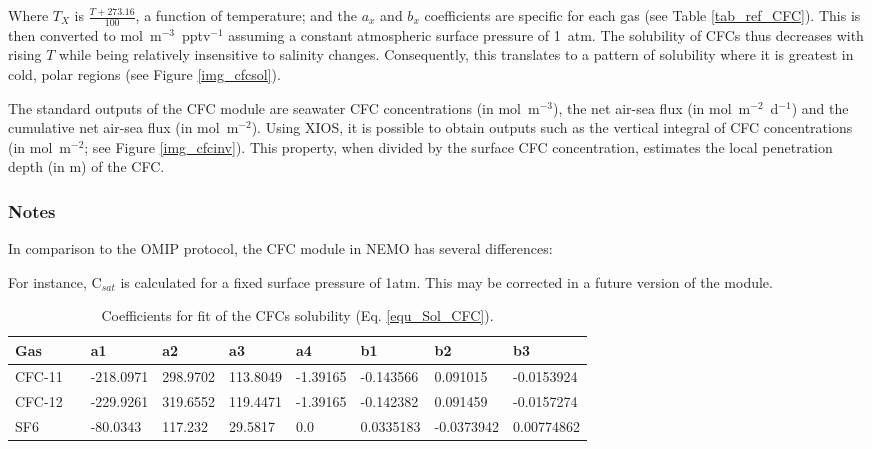 \documentclass[../main/TOP_manual]{subfiles}
\begin{document}
Where $T_{X}$ is $\frac{T + 273.16}{100}$, a function of temperature;
and the $a_{x}$ and $b_{x}$ coefficients are specific for each gas (see Table \autoref{tab_ref_CFC}).
This is then converted to mol~m$^{-3}$~pptv$^{-1}$ assuming a constant atmospheric surface pressure of 1~atm.
The solubility of CFCs thus decreases with rising $T$ while being relatively insensitive to salinity changes.
Consequently, this translates to a pattern of solubility where it is greatest in cold, polar regions (see Figure \autoref{img_cfcsol}).


The standard outputs of the CFC module are seawater CFC concentrations (in mol~m$^{-3}$), the net air-sea flux (in mol~m$^{-2}$~d$^{-1}$) and the cumulative net air-sea flux (in mol~m$^{-2}$).
Using XIOS, it is possible to obtain outputs such as the vertical integral of CFC concentrations (in mol~m$^{-2}$; see Figure \autoref{img_cfcinv}).
This property, when divided by the surface CFC concentration, estimates the local penetration depth (in m) of the CFC.


\subsubsection{Notes}

In comparison to the OMIP protocol, the CFC module in NEMO has several differences:


For instance, C$_{sat}$ is calculated for a fixed surface pressure of 1atm. This may be corrected in a future version of the module.


\begin{table}[!t]
\caption{Coefficients for fit of the CFCs solubility (Eq. \autoref{equ_Sol_CFC}).}
\vskip4mm
\centering
\begin{tabular}{l l l l l l l l l}
\hline
Gas   & & a1 & a2 & a3 & a4 & b1 & b2 & b3 \\
\hline
CFC-11 & & -218.0971 & 298.9702 & 113.8049 & -1.39165 & -0.143566  & 0.091015   & -0.0153924 \\
CFC-12 & & -229.9261 & 319.6552 & 119.4471 & -1.39165 & -0.142382  & 0.091459   & -0.0157274 \\
SF6    & & -80.0343  & 117.232  & 29.5817  & 0.0      & 0.0335183  & -0.0373942 & 0.00774862 \\
\hline
\end{tabular}
\label{tab_ref_CFC}
\end{table}
\end{document}
